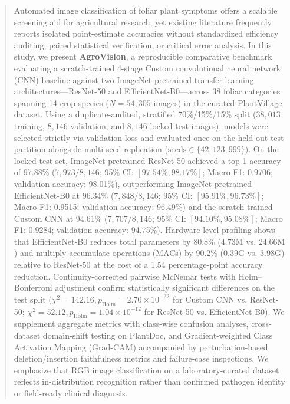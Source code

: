 \documentclass[journal]{IEEEtran}
\begin{document}
\begin{abstract}
Automated image classification of foliar plant symptoms offers a scalable screening aid for agricultural research, yet existing literature frequently reports isolated point-estimate accuracies without standardized efficiency auditing, paired statistical verification, or critical error analysis. In this study, we present \textbf{AgroVision}, a reproducible comparative benchmark evaluating a scratch-trained 4-stage Custom convolutional neural network (CNN) baseline against two ImageNet-pretrained transfer learning architectures---ResNet-50 and EfficientNet-B0---across 38 foliar categories spanning 14 crop species ($N = 54,305$ images) in the curated PlantVillage dataset. Using a duplicate-audited, stratified 70\%/15\%/15\% split ($38,013$ training, $8,146$ validation, and $8,146$ locked test images), models were selected strictly via validation loss and evaluated once on the held-out test partition alongside multi-seed replication ($\text{seeds} \in \{42, 123, 999\}$). On the locked test set, ImageNet-pretrained ResNet-50 achieved a top-1 accuracy of 97.88\% ($7,973 / 8,146$; 95\% CI: $[97.54\%, 98.17\%]$; Macro F1: 0.9706; validation accuracy: 98.01\%), outperforming ImageNet-pretrained EfficientNet-B0 at 96.34\% ($7,848 / 8,146$; 95\% CI: $[95.91\%, 96.73\%]$; Macro F1: 0.9515; validation accuracy: 96.49\%) and the scratch-trained Custom CNN at 94.61\% ($7,707 / 8,146$; 95\% CI: $[94.10\%, 95.08\%]$; Macro F1: 0.9284; validation accuracy: 94.75\%). Hardware-level profiling shows that EfficientNet-B0 reduces total parameters by 80.8\% ($4.73\text{M}$ vs. $24.66\text{M}$) and multiply-accumulate operations (MACs) by 90.2\% ($0.39\text{G}$ vs. $3.98\text{G}$) relative to ResNet-50 at the cost of a 1.54 percentage-point accuracy reduction. Continuity-corrected pairwise McNemar tests with Holm--Bonferroni adjustment confirm statistically significant differences on the test split ($\chi^2 = 142.16, p_{\text{Holm}} = 2.70 \times 10^{-32}$ for Custom CNN vs. ResNet-50; $\chi^2 = 52.12, p_{\text{Holm}} = 1.04 \times 10^{-12}$ for ResNet-50 vs. EfficientNet-B0). We supplement aggregate metrics with class-wise confusion analyses, cross-dataset domain-shift testing on PlantDoc, and Gradient-weighted Class Activation Mapping (Grad-CAM) accompanied by perturbation-based deletion/insertion faithfulness metrics and failure-case inspections. We emphasize that RGB image classification on a laboratory-curated dataset reflects in-distribution recognition rather than confirmed pathogen identity or field-ready clinical diagnosis.
\end{abstract}
\end{document}
